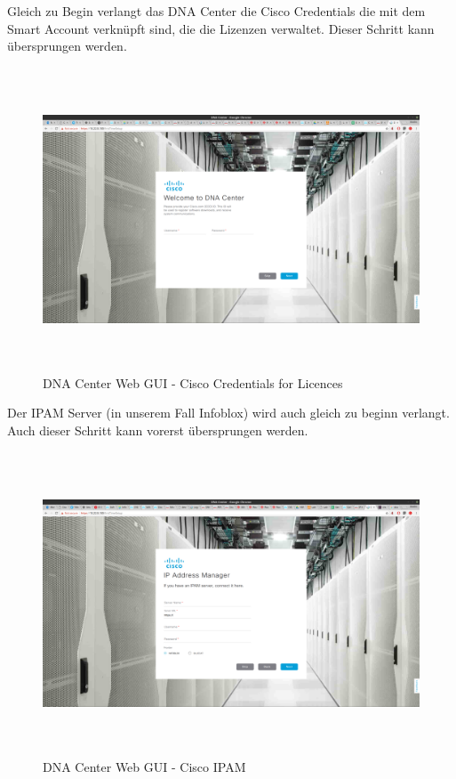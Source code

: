 Gleich zu Begin verlangt das DNA Center die Cisco Credentials die mit dem Smart Account verknüpft sind, die die Lizenzen verwaltet. Dieser Schritt kann übersprungen werden. 

\begin{figure}[H]
	\centering
	\includegraphics[height=9cm]{img/sc_006.png}
	\caption{DNA Center Web GUI - Cisco Credentials for Licences}
	\label{fig:dna-center-gui-2}
\end{figure}

Der IPAM Server (in unserem Fall Infoblox) wird auch gleich zu beginn verlangt. Auch dieser Schritt kann vorerst übersprungen werden.

\begin{figure}[H]
	\centering
	\includegraphics[height=9cm]{img/sc_007.png}
	\caption{DNA Center Web GUI - Cisco IPAM}
	\label{fig:dna-center-gui-3}
\end{figure}

